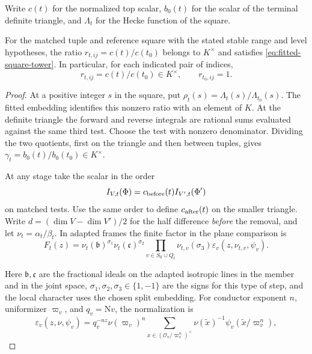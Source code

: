 Write \(c(t)\) for the normalized top scalar, \(b_0(t)\)
for the scalar of the terminal definite triangle, and
\(\Lambda_t\) for the Hecke function of the square.
\begin{proposition}\label{prop:fitted-square-ratio-identity}
For the matched tuple and reference square with the stated
stable range and level hypotheses, the ratio \(r_{t,ij}=c(t)/c(t_0)\)
belongs to \(K^\times\) and satisfies \eqref{eq:fitted-square-tower}.
In particular, for each indicated pair of indices,
\[
 r_{t,ij}=c(t)/c(t_0)\in K^\times,\qquad r_{t_0,ij}=1.
\]

\end{proposition}

\begin{proof}

At a positive integer \(s\) in the square, put
\(\rho_t(s)=\Lambda_t(s)/\Lambda_{t_0}(s)\). The fitted embedding
identifies this nonzero ratio with an element of \(K\). At the definite
triangle the forward and reverse integrals are rational sums evaluated
against the same third test. Choose the test with nonzero denominator.
Dividing the two quotients, first on the triangle and then between
tuples, gives \(\gamma_t=b_0(t)/b_0(t_0)\in K^\times\).

At any stage take the scalar in the order
\[
 I_{V,t}(\Phi)=c_{\rm before}(t) I_{V',t}(\Phi')
\]
on matched tests. Use the same order to define \(c_{\rm after}(t)\)
on the smaller triangle. Write \(d=(\dim V-\dim V')/2\) for the
half difference \emph{before} the removal, and let
\(\nu_t=\alpha_t/\beta_t\). In adapted frames the finite factor in
the plane comparison is
\[
 F_t(z)=\nu_t(\mathfrak b)^{\sigma_1}\nu_t(\mathfrak c)^{\sigma_2}
    \prod_{v\in S_0\cup Q_t}\nu_{t,v}(\sigma_3)
                        \varepsilon_v(z,\nu_{t,v},\psi_v).
\]

Here \(\mathfrak b,\mathfrak c\) are the fractional ideals on the
adapted isotropic lines in the member and in the joint space,
\(\sigma_1,\sigma_2,\sigma_3\in\{1,-1\}\) are the signs for this
type of step, and the local character uses the chosen split embedding.
For conductor exponent \(n\), uniformizer \(\varpi_v\), and
\(q_v=\mathrm Nv\), the normalization is
\[
 \varepsilon_v(z,\nu,\psi_v)=q_v^{-nz}\nu(\varpi_v)^n
   \sum_{x\in(\mathcal O_v/\varpi_v^n)^\times}
          \nu(\tilde x)^{-1}\psi_v(\tilde x/\varpi_v^n),
\]


\end{proof}
